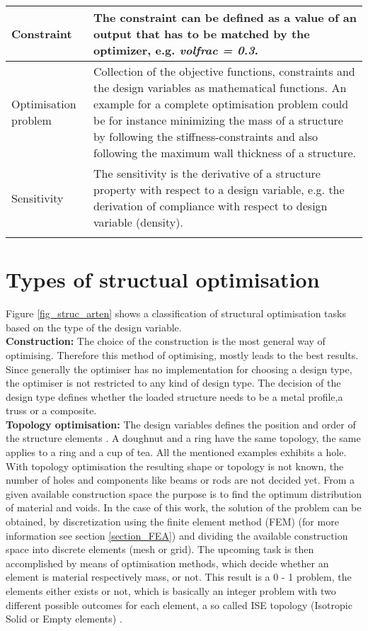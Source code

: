 \begin{longtable}{L{0.2\textwidth} L{0.8\textwidth}}
Constraint & The constraint can be defined as a value of an output that has to be matched by the optimizer, e.g. \textit{volfrac = 0.3}.\\
\hline

Optimisation problem & Collection of the objective functions, constraints and the design variables as mathematical functions. An example for a complete optimisation problem could be for instance minimizing the mass of a structure by following the stiffness-constraints and also following the maximum wall thickness of a structure.\\
\hline
Sensitivity & The sensitivity is the derivative of a structure property with respect to a design variable, e.g. the derivation of compliance with respect to design
variable (density).\\
\hline
\label{tabel_basics}
\end{longtable}
\endgroup

 
\section{Types of structual optimisation} 
Figure \ref{fig_struc_arten} shows a classification of structural optimisation tasks based on the type of the design variable. \\

{\large{\textbf{Construction:}} }
The choice of the construction is the most general way of optimising. Therefore this method of optimising, mostly leads to the best results. Since
generally the optimiser has no implementation for
choosing a design type, the optimiser is not restricted to any kind of design type.
The decision of the design type defines whether the loaded structure needs to be a metal profile,a truss or a composite.\\

 {\large{\textbf{Topology optimisation:}}}
 The design variables defines the position and order of the structure elements
 \cite{Schumacher.2013}.
 A doughnut and a ring have the same topology,
 the same applies to a ring and a cup of tea. 
 All the mentioned examples exhibits a hole. With topology optimisation the resulting shape or topology is not known, the number of holes and components like beams or
 rods are not decided yet. From a given available construction space the purpose is to find the optimum distribution of material and voids. In
 the case of this work, the solution of the problem can
 be obtained, by discretization using the finite element method (FEM) (for more information see section \ref{section_FEA})
 and dividing the available construction space into discrete elements (mesh or grid).
 The upcoming task is then accomplished
 by means of optimisation methods, which decide whether an
 element is material
 respectively mass, or not. This result is a 0 - 1 problem, the elements either exists or not,
 which is basically an integer problem with two different possible outcomes for each element, a so called ISE topology (Isotropic Solid or Empty elements)
 \cite{Olason.2010}.\\
 
